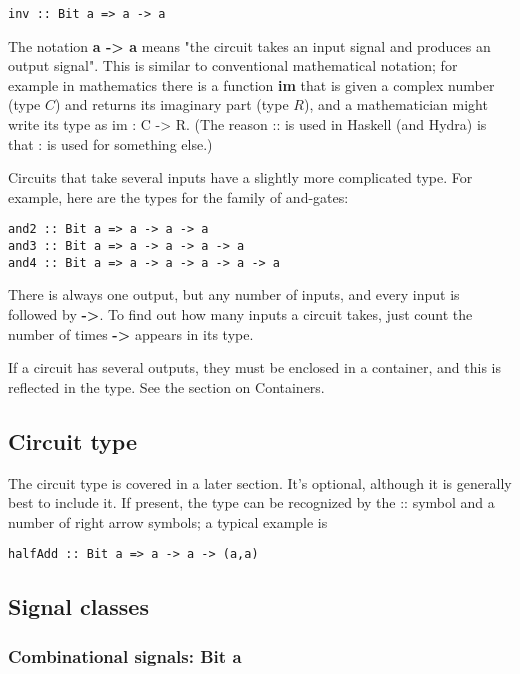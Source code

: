 \documentclass[11pt]{article}
\begin{document}
\begin{verbatim}
inv :: Bit a => a -> a
\end{verbatim}


The notation \textbf{a -> a} means "the circuit takes an input signal and
produces an output signal".  This is similar to conventional
mathematical notation; for example in mathematics there is a function
\textbf{im} that is given a complex number (type \(C\)) and returns its
imaginary part (type \(R\)), and a mathematician might write its type as
im : C -> R.  (The reason :: is used in Haskell (and Hydra) is that :
is used for something else.)

Circuits that take several inputs have a slightly more complicated
type.  For example, here are the types for the family of and-gates:

\begin{verbatim}
and2 :: Bit a => a -> a -> a
and3 :: Bit a => a -> a -> a -> a
and4 :: Bit a => a -> a -> a -> a -> a
\end{verbatim}

There is always one output, but any number of inputs, and every input
is followed by \textbf{->}.  To find out how many inputs a circuit takes,
just count the number of times \textbf{->} appears in its type.

If a circuit has several outputs, they must be enclosed in a
container, and this is reflected in the type.  See the section on
Containers.

\subsection{Circuit type}
\label{sec:org8e1a45f}

The circuit type is covered in a later section.  It's optional,
although it is generally best to include it.  If present, the type can
be recognized by the :: symbol and a number of right arrow symbols; a
typical example is

\begin{verbatim}
halfAdd :: Bit a => a -> a -> (a,a)
\end{verbatim}

\subsection{Signal classes}
\label{sec:org8b966ea}
\subsubsection{Combinational signals: Bit a}
\label{sec:org45e5e70}
\end{document}
